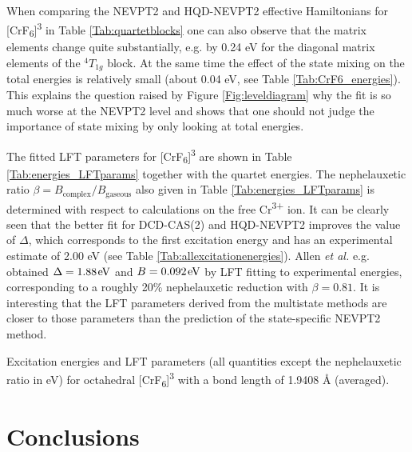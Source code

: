 When comparing the NEVPT2 and HQD-NEVPT2 effective Hamiltonians for [CrF\textsubscript{6}]\textsuperscript{3\textminus} in Table \ref{Tab:quartetblocks} one can also observe that the matrix elements change quite substantially, e.g. by 0.24 eV for the diagonal matrix elements of the $^4T_{1g}$ block. At the same time the effect of the state mixing on the total energies is relatively small (about 0.04 eV, see Table \ref{Tab:CrF6_energies}). This explains the question raised by Figure \ref{Fig:leveldiagram} why the fit is so much worse at the NEVPT2 level and shows that one should not judge the importance of state mixing by only looking at total energies.

The fitted LFT parameters for [CrF\textsubscript{6}]\textsuperscript{3\textminus} are shown in Table \ref{Tab:energies_LFTparams} together with the quartet energies. The nephelauxetic ratio $\beta  = {B_{{\text{complex}}}}/{B_{{\text{gaseous}}}}$ also given in Table \ref{Tab:energies_LFTparams} is determined with respect to calculations on the free Cr\textsuperscript{3+} ion. It can be clearly seen that the better fit for DCD-CAS(2) and HQD-NEVPT2 improves the value of $\Delta $, which corresponds to the first excitation energy and has an experimental estimate of 2.00 eV (see Table \ref{Tab:allexcitationenergies}). Allen \textit{et al.} e.g. obtained $\Delta  = 1.88{\mkern 1mu} {\mkern 1mu} {\text{eV}}$ and $B = 0.092{\mkern 1mu} {\mkern 1mu} {\text{eV}}$ by LFT fitting to experimental energies, corresponding to a roughly 20\% nephelauxetic reduction with $\beta  = 0.81$.\cite{AllenEW_1971_2538} It is interesting that the LFT parameters derived from the multistate methods are closer to those parameters than the prediction of the state-specific NEVPT2 method.
\begin{table}
\small
\centering
\ttabbox
{\caption[Excitation energies and LFT parameters for octahedral {[CrF\textsubscript{6}]}\textsuperscript{3\textminus}.]{Excitation energies and LFT parameters (all quantities except the nephelauxetic ratio in eV) for octahedral [CrF\textsubscript{6}]\textsuperscript{3\textminus} with a bond length of 1.9408 Å (averaged).}
\label{Tab:energies_LFTparams}}
{}
\end{table}

\chapter{Conclusions}
